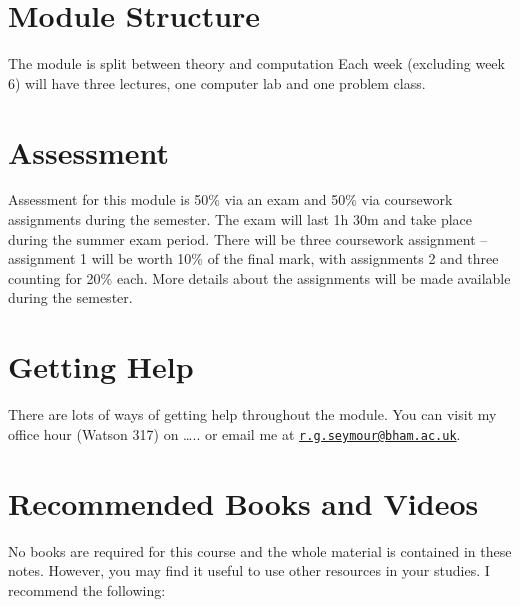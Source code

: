 \documentclass[
]{book}
\theoremstyle{definition}
\theoremstyle{definition}
\theoremstyle{definition}
\theoremstyle{definition}
\theoremstyle{remark}
\begin{document}
\hypertarget{module-structure}{%
\section{Module Structure}\label{module-structure}}

The module is split between theory and computation Each week (excluding
week 6) will have three lectures, one computer lab and one problem
class.

\hypertarget{assessment}{%
\section{Assessment}\label{assessment}}

Assessment for this module is 50\% via an exam and 50\% via coursework
assignments during the semester. The exam will last 1h 30m and take
place during the summer exam period. There will be three coursework
assignment -- assignment 1 will be worth 10\% of the final mark, with
assignments 2 and three counting for 20\% each. More details about the
assignments will be made available during the semester.

\hypertarget{getting-help}{%
\section{Getting Help}\label{getting-help}}

There are lots of ways of getting help throughout the module. You can
visit my office hour (Watson 317) on \ldots.. or email me at
\href{mailto:r.g.seymour@bham.ac.uk}{\nolinkurl{r.g.seymour@bham.ac.uk}}.

\hypertarget{recommended-books-and-videos}{%
\section{Recommended Books and Videos}\label{recommended-books-and-videos}}

No books are required for this course and the whole material is
contained in these notes. However, you may find it useful to use other
resources in your studies. I recommend the following:
\end{document}
